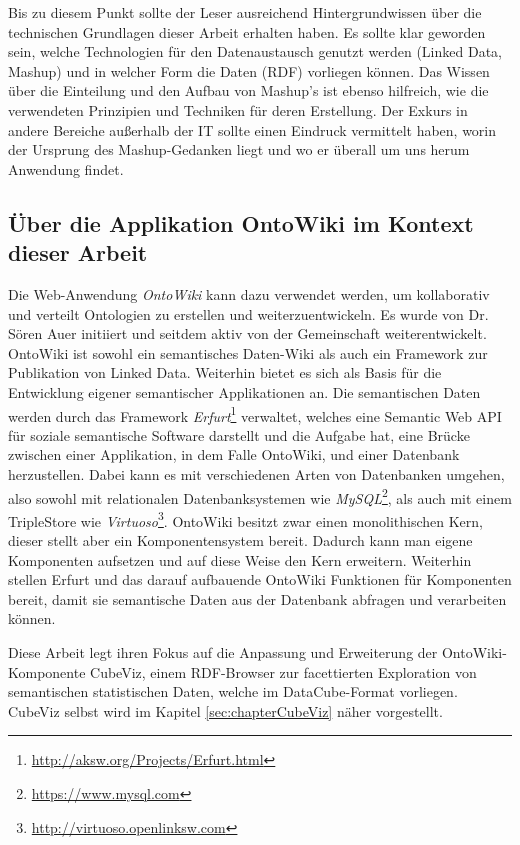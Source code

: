\documentclass[11pt]{article}
\newcommand{\com}[1]{\marginpar{\em {\small{#1}}}} %
\begin{document}
\noindent
Bis zu diesem Punkt sollte der Leser ausreichend Hintergrundwissen über die technischen Grundlagen dieser Arbeit erhalten haben. Es sollte klar geworden sein, welche Technologien für den Datenaustausch genutzt werden (Linked Data, Mashup) und in welcher Form die Daten (RDF) vorliegen können. Das Wissen über die Einteilung und den Aufbau von Mashup's ist ebenso hilfreich, wie die verwendeten Prinzipien und Techniken für deren Erstellung. Der Exkurs in andere Bereiche außerhalb der IT sollte einen Eindruck vermittelt haben, worin der Ursprung des Mashup-Gedanken liegt und wo er überall um uns herum Anwendung findet.

%
%
\subsection{Über die Applikation OntoWiki im Kontext dieser Arbeit}
\label{sec:chapterBasicsOW}

Die Web-Anwendung \textit{OntoWiki} kann dazu verwendet werden, um kollaborativ und verteilt Ontologien zu erstellen und weiterzuentwickeln. Es wurde von Dr. Sören \mbox{Auer} initiiert und seitdem aktiv von der Gemeinschaft weiterentwickelt. OntoWiki ist sowohl ein semantisches Daten-Wiki als auch ein Framework zur Publikation von Linked Data. Weiterhin bietet es sich als Basis für die Entwicklung eigener semantischer Applikationen an. Die semantischen Daten werden durch das Framework \textit{Erfurt}\footnote{\url{http://aksw.org/Projects/Erfurt.html}} verwaltet, welches eine Semantic Web API für soziale semantische Software darstellt und die Aufgabe hat, eine Brücke zwischen einer Applikation, in dem Falle OntoWiki, und einer Datenbank herzustellen. Dabei kann es mit verschiedenen Arten von Datenbanken umgehen, also sowohl mit relationalen Datenbanksystemen wie \textit{MySQL}\footnote{\url{https://www.mysql.com}}, als auch mit einem TripleStore wie \textit{Virtuoso}\footnote{\url{http://virtuoso.openlinksw.com}}. OntoWiki besitzt zwar einen monolithischen Kern, dieser stellt aber ein Komponentensystem bereit. Dadurch kann man eigene Komponenten aufsetzen und auf diese Weise den Kern erweitern. Weiterhin stellen Erfurt und das darauf aufbauende OntoWiki Funktionen für Komponenten bereit, damit sie semantische Daten aus der Datenbank abfragen und verarbeiten können. \cite{ONTOW}

Diese Arbeit legt ihren Fokus auf die Anpassung und Erweiterung der OntoWiki-Komponente CubeViz, einem RDF-Browser zur facettierten Exploration von semantischen statistischen Daten, welche im DataCube-Format vorliegen.\com{Kapitel \ref{sec:chapterCubeViz} \\ S. \pageref{sec:chapterCubeViz}} CubeViz selbst wird im Kapitel \ref{sec:chapterCubeViz} näher vorgestellt.
\end{document}
